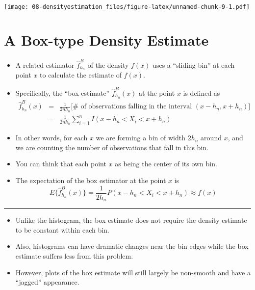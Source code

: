 \documentclass[]{book}
\begin{document}
\texttt{[image: 08-densityestimation\_files/figure-latex/unnamed-chunk-9-1.pdf]}

\hypertarget{a-box-type-density-estimate}{%
\section{A Box-type Density Estimate}\label{a-box-type-density-estimate}}

\begin{itemize}
\item
  A related estimator \(\hat{f}_{h_{n}}^{B}\) of the density \(f(x)\) uses a
  ``sliding bin'' at each point \(x\) to calculate the estimate of \(f(x)\).
\item
  Specifically, the ``box estimate'' \(\hat{f}_{h_{n}}^{B}(x)\) at the point \(x\) is defined as
  \begin{eqnarray}
  \hat{f}_{h_{n}}^{B}(x) &=& \frac{1}{2nh_{n}} \Big[ \# \text{ of observations falling in the interval } (x - h_{n}, x + h_{n}) \Big] \nonumber \\
  &=& \frac{1}{2nh_{n}} \sum_{i=1}^{n} I(x - h_{n} < X_{i} < x + h_{n} ) \nonumber
  \end{eqnarray}
\item
  In other words, for each \(x\) we are forming a bin of width \(2h_{n}\) around \(x\), and we are counting
  the number of observations that fall in this bin.
\item
  You can think that each point \(x\) as being the center of its own bin.
\item
  The expectation of the box estimator at the point \(x\) is\\
  \begin{equation}
  E \{ \hat{f}_{h_{n}}^{B}(x) \}
  = \frac{1}{2h_{n}} P(x - h_{n} < X_{i}  < x + h_{n}) 
  \approx f(x)  \nonumber 
  \end{equation}
\end{itemize}

\begin{center}\rule{0.5\linewidth}{\linethickness}\end{center}

\begin{itemize}
\item
  Unlike the histogram, the box estimate does not require the density estimate
  to be constant within each bin.
\item
  Also, histograms can have dramatic changes near
  the bin edges while the box estimate suffers less from this problem.
\item
  However, plots of the box estimate will still largely be non-smooth and
  have a ``jagged'' appearance.
\end{itemize}
\end{document}
